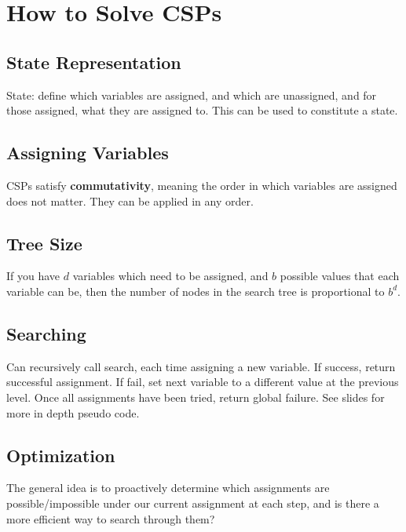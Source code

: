 \documentclass[letterpaper]{article} %
\begin{document}
\section{How to Solve CSPs}

\subsection{State Representation}

State: define which variables are assigned, and which are unassigned, and for those assigned, what they are assigned to. This can be used to constitute a state.

\subsection{Assigning Variables}

CSPs satisfy \textbf{commutativity}, meaning the order in which variables are assigned does not matter. They can be applied in any order.

\subsection{Tree Size}

If you have $d$ variables which need to be assigned, and $b$ possible values that each variable can be, then the number of nodes in the search tree is proportional to $b^d$.

\subsection{Searching}

Can recursively call search, each time assigning a new variable. If success, return successful assignment. If fail, set next variable to a different value at the previous level. Once all assignments have been tried, return global failure. See slides for more in depth pseudo code.

\subsection{Optimization}

The general idea is to proactively determine which assignments are possible/impossible under our current assignment at each step, and is there a more efficient way to search through them?
\end{document}
